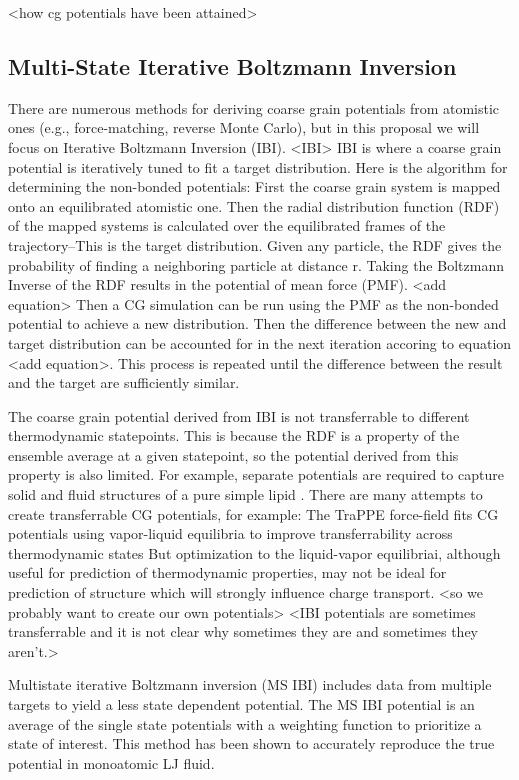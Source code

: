 <how cg potentials have been attained>

\subsection*{Multi-State Iterative Boltzmann Inversion}

There are numerous methods for deriving coarse grain potentials from atomistic ones (e.g., force-matching, reverse Monte Carlo), but in this proposal we will focus on Iterative Boltzmann Inversion (IBI).
<IBI>
IBI is where a coarse grain potential is iteratively tuned to fit a target distribution. \cite{Reith2003a}
Here is the algorithm for determining the non-bonded potentials:
First the coarse grain system is mapped onto an equilibrated atomistic one.
Then the radial distribution function (RDF) of the mapped systems is calculated over the equilibrated frames of the trajectory--This is the target distribution.
Given any particle, the RDF gives the probability of finding a neighboring particle at distance r.
Taking the Boltzmann Inverse of the RDF results in the potential of mean force (PMF). <add equation>
Then a CG simulation can be run using the PMF as the non-bonded potential to achieve a new distribution.
Then the difference between the new and target distribution can be accounted for in the next iteration accoring to equation <add equation>.
This process is repeated until the difference between the result and the target are sufficiently similar.

The coarse grain potential derived from IBI is not transferrable to different thermodynamic statepoints.
This is because the RDF is a property of the ensemble average at a given statepoint, so the potential derived from this property is also limited.
For example, separate potentials are required to capture solid and fluid structures of a pure simple lipid \cite{Hadley2010a}.
There are many attempts to create transferrable CG potentials, for example:
The TraPPE force-field fits CG potentials using vapor-liquid equilibria to improve transferrability across thermodynamic states\cite{Maerzke2011}
But optimization to the liquid-vapor equilibriai, although useful for prediction of thermodynamic properties, may not be ideal for prediction of structure which will strongly influence charge transport.
<so we probably want to create our own potentials>
<IBI potentials are sometimes transferrable and it is not clear why sometimes they are and sometimes they aren't.> \cite{Moore2014}

Multistate iterative Boltzmann inversion (MS IBI) includes data from multiple targets to yield a less state dependent potential.\cite{Moore2014}
The MS IBI potential is an average of the single state potentials with a weighting function to prioritize a state of interest.
This method has been shown to accurately reproduce the true potential in monoatomic LJ fluid.

